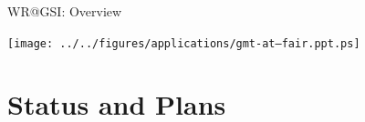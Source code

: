 \documentclass[compress,red]{beamer}
\begin{document}
\begin{frame}{WR@GSI: Overview}


      \begin{center}
	\texttt{[image: ../../figures/applications/gmt-at--fair.ppt.ps]}
      \end{center}  

\end{frame}



\section{Status and Plans}
\end{document}
